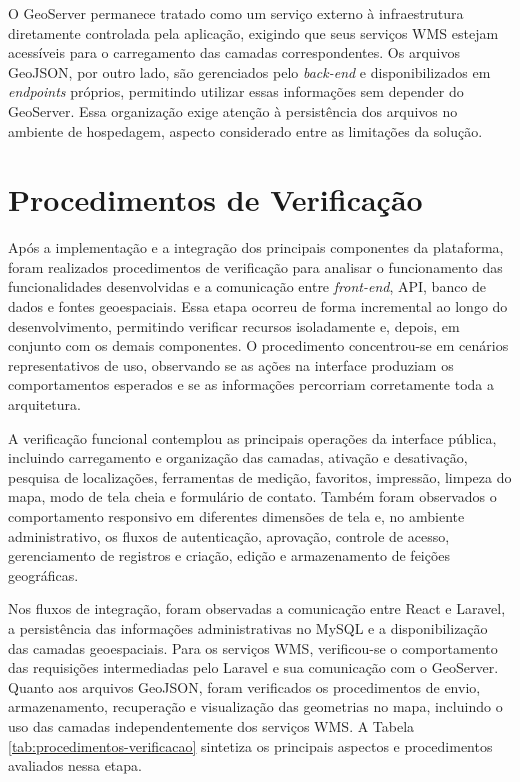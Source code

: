 O GeoServer permanece tratado como um serviço externo à infraestrutura diretamente controlada pela aplicação, exigindo que seus serviços WMS estejam acessíveis para o carregamento das camadas correspondentes. Os arquivos GeoJSON, por outro lado, são gerenciados pelo \textit{back-end} e disponibilizados em \textit{endpoints} próprios, permitindo utilizar essas informações sem depender do GeoServer. Essa organização exige atenção à persistência dos arquivos no ambiente de hospedagem, aspecto considerado entre as limitações da solução.

\section{Procedimentos de Verificação}
\label{sec:procedimentos-verificacao}

Após a implementação e a integração dos principais componentes da plataforma, foram realizados procedimentos de verificação para analisar o funcionamento das funcionalidades desenvolvidas e a comunicação entre \textit{front-end}, API, banco de dados e fontes geoespaciais. Essa etapa ocorreu de forma incremental ao longo do desenvolvimento, permitindo verificar recursos isoladamente e, depois, em conjunto com os demais componentes. O procedimento concentrou-se em cenários representativos de uso, observando se as ações na interface produziam os comportamentos esperados e se as informações percorriam corretamente toda a arquitetura.

A verificação funcional contemplou as principais operações da interface pública, incluindo carregamento e organização das camadas, ativação e desativação, pesquisa de localizações, ferramentas de medição, favoritos, impressão, limpeza do mapa, modo de tela cheia e formulário de contato. Também foram observados o comportamento responsivo em diferentes dimensões de tela e, no ambiente administrativo, os fluxos de autenticação, aprovação, controle de acesso, gerenciamento de registros e criação, edição e armazenamento de feições geográficas.

Nos fluxos de integração, foram observadas a comunicação entre React e Laravel, a persistência das informações administrativas no MySQL e a disponibilização das camadas geoespaciais. Para os serviços WMS, verificou-se o comportamento das requisições intermediadas pelo Laravel e sua comunicação com o GeoServer. Quanto aos arquivos GeoJSON, foram verificados os procedimentos de envio, armazenamento, recuperação e visualização das geometrias no mapa, incluindo o uso das camadas independentemente dos serviços WMS. A Tabela \ref{tab:procedimentos-verificacao} sintetiza os principais aspectos e procedimentos avaliados nessa etapa.

